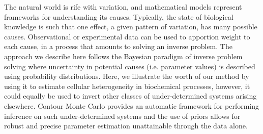 The natural world is rife with variation, and mathematical models represent frameworks for understanding its causes. Typically, the state of biological knowledge is such that one effect, a given pattern of variation, has many possible causes. Observational or experimental data can be used to apportion weight to each cause, in a process that amounts to solving an inverse problem. The approach we describe here follows the Bayesian paradigm of inverse problem solving where uncertainty in potential causes (i.e. parameter values) is described using probability distributions. Here, we illustrate the worth of our method by using it to estimate cellular heterogeneity in biochemical processes, however, it could equally be used to invert other classes of under-determined systems arising elsewhere. Contour Monte Carlo provides an automatic framework for performing inference on such under-determined systems and the use of priors allows for robust and precise parameter estimation unattainable through the data alone.

